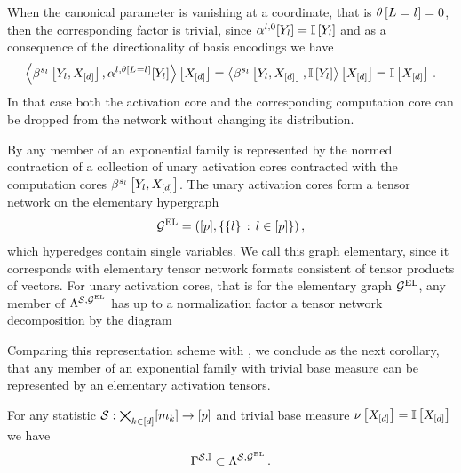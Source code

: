 When the canonical parameter is vanishing at a coordinate, that is $\theta\left[L_{}=l_{}\right]=0$, then the corresponding factor is trivial, since $\alpha^{l,0}[Y_{l}]=\mathbb{I}\left[Y_{l}\right]$ and as a consequence of the directionality of basis encodings we have
\begin{align*}
    \left\langle \beta^{s_{l}}\left[Y_{l},X_{[d]}\right],\alpha^{l,\theta\left[L_{}=l_{}\right]}[Y_{l}]\right\rangle \left[ X_{[d]} \right]
    = \left\langle \beta^{s_{l}}\left[Y_{l},X_{[d]}\right],\mathbb{I}\left[Y_{l}\right]\right\rangle \left[ X_{[d]} \right]
    = \mathbb{I}\left[X_{[d]}\right] \, .
\end{align*}
In that case both the activation core and the corresponding computation core can be dropped from the network without changing its distribution.

By  any member of an exponential family is represented by the normed contraction of a collection of unary activation cores contracted with the computation cores $\beta^{s_{l}}\left[Y_{l},X_{[d]}\right]$.
The unary activation cores form a tensor network on the elementary hypergraph
\begin{align*}
    \mathcal{G}^{\mathrm{EL}}=([p],\{\{l\}\,:\,l\in[p]\}) \, ,
\end{align*}
which hyperedges contain single variables.
We call this graph elementary, since it corresponds with elementary tensor network formats consistent of tensor products of vectors.
For unary activation cores, that is for the elementary graph $\mathcal{G}^{\mathrm{EL}}$, any member of $\Lambda^{\mathcal{S},\mathcal{G}^{\mathrm{EL}}}$ has up to a normalization factor a tensor network decomposition by the diagram
\begin{center}
    
\end{center}
Comparing this representation scheme with , we conclude as the next corollary, that any member of an exponential family with trivial base measure can be represented by an elementary activation tensors.

\begin{corollary}
    \label{cor:unaryActivationExpdistRealization}
    For any statistic $\mathcal{S}:\bigtimes_{k\in[d]}[m_{k}]\rightarrow[p]$ and trivial base measure $\nu\left[X_{[d]}\right]=\mathbb{I}\left[X_{[d]}\right]$ we have
    \begin{align*}
        \Gamma^{\mathcal{S},\mathbb{I}} \subset \Lambda^{\mathcal{S},\mathcal{G}^{\mathrm{EL}}} \, .
    \end{align*}
\end{corollary}

